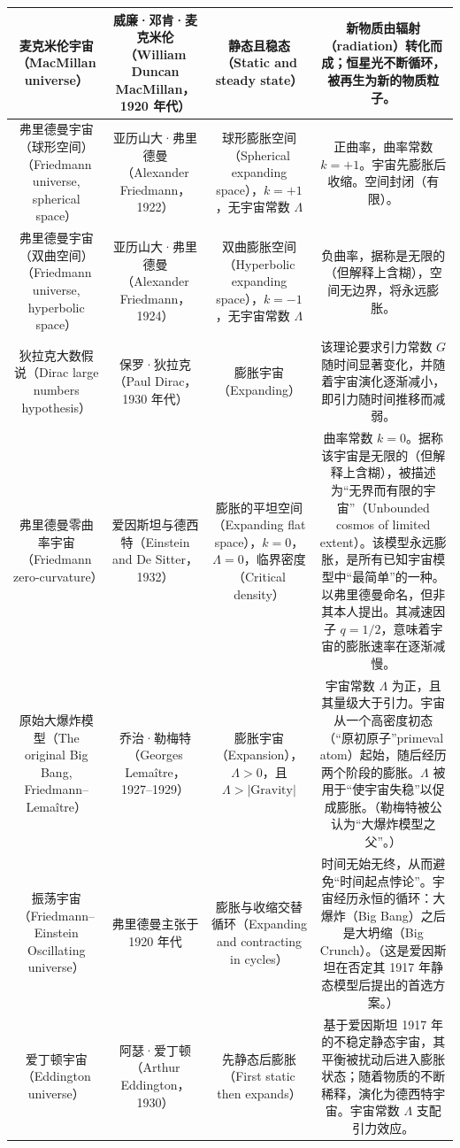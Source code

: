 \begin{table}[ht]
\begin{tabular}{|c|c|c|c|}
\hline
麦克米伦宇宙（MacMillan universe）& 威廉·邓肯·麦克米伦（William Duncan MacMillan，1920 年代）& 静态且稳态（Static and steady state）& 新物质由辐射（radiation）转化而成；恒星光不断循环，被再生为新的物质粒子。\\
\hline
弗里德曼宇宙（球形空间）（Friedmann universe, spherical space） & 亚历山大·弗里德曼（Alexander Friedmann，1922）& 球形膨胀空间（Spherical expanding space），$k = +1$，无宇宙常数 $\Lambda$ & 正曲率，曲率常数 $k = +1$。宇宙先膨胀后收缩。空间封闭（有限）。\\
\hline
弗里德曼宇宙（双曲空间）（Friedmann universe, hyperbolic space） & 亚历山大·弗里德曼（Alexander Friedmann，1924）& 双曲膨胀空间（Hyperbolic expanding space），$k = -1$，无宇宙常数 $\Lambda$ & 负曲率，据称是无限的（但解释上含糊），空间无边界，将永远膨胀。\\
\hline
狄拉克大数假说（Dirac large numbers hypothesis）& 保罗·狄拉克（Paul Dirac，1930 年代）& 膨胀宇宙（Expanding）& 该理论要求引力常数 $G$ 随时间显著变化，并随着宇宙演化逐渐减小，即引力随时间推移而减弱。\\
\hline
弗里德曼零曲率宇宙（Friedmann zero-curvature）& 爱因斯坦与德西特（Einstein and De Sitter，1932）& 膨胀的平坦空间（Expanding flat space），$k = 0$，$\Lambda = 0$，临界密度（Critical density）& 曲率常数 $k = 0$。据称该宇宙是无限的（但解释上含糊），被描述为“无界而有限的宇宙”（Unbounded cosmos of limited extent）。该模型永远膨胀，是所有已知宇宙模型中“最简单”的一种。以弗里德曼命名，但非其本人提出。其减速因子 $q = 1/2$，意味着宇宙的膨胀速率在逐渐减慢。\\
\hline
原始大爆炸模型（The original Big Bang, Friedmann–Lemaître）& 乔治·勒梅特（Georges Lemaître，1927–1929）& 膨胀宇宙（Expansion），$\Lambda > 0$，且 $\Lambda > |\text{Gravity}|$ & 宇宙常数 $\Lambda$ 为正，且其量级大于引力。宇宙从一个高密度初态（“原初原子”primeval atom）起始，随后经历两个阶段的膨胀。$\Lambda$ 被用于“使宇宙失稳”以促成膨胀。（勒梅特被公认为“大爆炸模型之父”。）\\
\hline
振荡宇宙（Friedmann–Einstein Oscillating universe）& 弗里德曼主张于 1920 年代 & 膨胀与收缩交替循环（Expanding and contracting in cycles）& 时间无始无终，从而避免“时间起点悖论”。宇宙经历永恒的循环：大爆炸（Big Bang）之后是大坍缩（Big Crunch）。（这是爱因斯坦在否定其 1917 年静态模型后提出的首选方案。）\\
\hline
爱丁顿宇宙（Eddington universe）& 阿瑟·爱丁顿（Arthur Eddington，1930） & 先静态后膨胀（First static then expands）& 基于爱因斯坦 1917 年的不稳定静态宇宙，其平衡被扰动后进入膨胀状态；随着物质的不断稀释，演化为德西特宇宙。宇宙常数 $\Lambda$ 支配引力效应。\\

\end{tabular}
\end{table}
